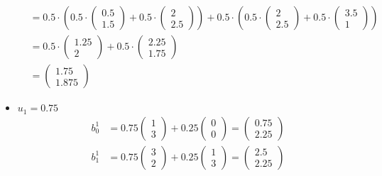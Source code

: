 \documentclass[a4paper]{scrartcl}
\begin{document}
\begin{itemize}
\begin{align*}
          & =0.5 \cdot (0.5 \cdot \begin{pmatrix}0.5\\ 1.5 \end{pmatrix} + 0.5 \cdot \begin{pmatrix}2\\ 2.5 \end{pmatrix}) + 0.5 \cdot (0.5 \cdot \begin{pmatrix}2\\ 2.5 \end{pmatrix} + 0.5 \cdot \begin{pmatrix}3.5\\ 1 \end{pmatrix})\\
          & =0.5 \cdot \begin{pmatrix}1.25\\ 2 \end{pmatrix} + 0.5 \cdot \begin{pmatrix}2.25\\ 1.75 \end{pmatrix}\\
          &= \begin{pmatrix}1.75\\ 1.875 \end{pmatrix}
      \end{align*}
    \item $u_1=0.75$\\
      \begin{align*}
        b_0^1&=0.75 \begin{pmatrix}1\\ 3 \end{pmatrix} + 0.25  \begin{pmatrix}0\\ 0 \end{pmatrix} =  \begin{pmatrix}0.75\\ 2.25 \end{pmatrix}\\
        b_1^1&=0.75 \begin{pmatrix}3\\ 2 \end{pmatrix} + 0.25  \begin{pmatrix}1\\ 3 \end{pmatrix} =  \begin{pmatrix}2.5\\ 2.25 \end{pmatrix}\\

\end{align*}
\end{itemize}
\end{document}
